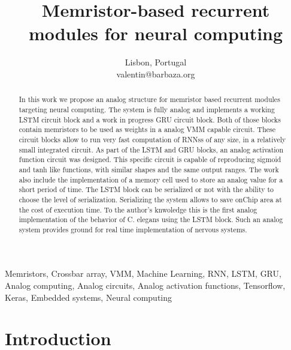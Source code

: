 \documentclass[conference]{IEEEtran}
\begin{document}
\title{Memristor-based recurrent modules for neural computing}


\author{
Lisbon, Portugal \\
valentin@barbaza.org}


\maketitle

\begin{abstract}
  In this work we propose an analog structure for memristor based recurrent modules targeting neural computing. The system is fully analog and implements a working \ac{LSTM} circuit block and a work in progress \ac{GRU} circuit block. Both of those blocks contain memristors to be used as weights in a analog \ac{VMM} capable circuit. These circuit blocks allow to run very fast computation of \aclp{RNNs} of any size, in a relatively small integrated circuit. As part of the \ac{LSTM} and \ac{GRU} blocks, an analog activation function circuit was designed. This specific circuit is capable of reproducing sigmoid and \ac{tanh} like functions, with similar shapes and the same output ranges. The work also include the implementation of a memory cell used to store an analog value for a short period of time. The \ac{LSTM} block can be serialized or not with the ability to choose the level of serialization. Serializing the system allows to save onChip area at the cost of execution time. To the author's knwoledge this is the first analog implementation of the behavior of \acs{C. elegans} using the \ac{LSTM} block. Such an analog system provides ground for real time implementation of nervous systems.
\end{abstract}

\begin{IEEEkeywords}
  Memristors, Crossbar array, VMM, Machine Learning, RNN, LSTM, GRU, Analog computing, Analog circuits, Analog activation functions, Tensorflow, Keras, Embedded systems, Neural computing
\end{IEEEkeywords}

\section{Introduction}
\end{document}
